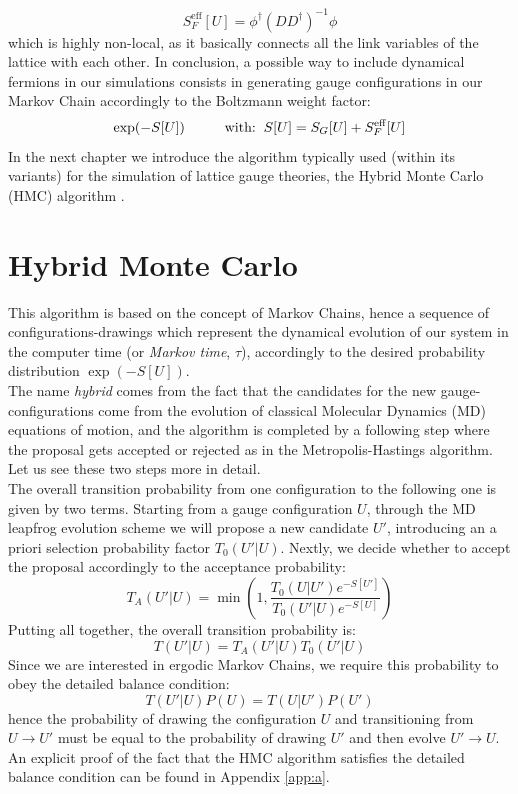\begin{equation}
    S_F^{\textrm{eff}} [U] = \phi^\dagger (DD^\dagger)^{-1} \phi
\end{equation}
which is highly non-local, as it basically connects all the link variables of the lattice with each other.
In conclusion, a possible way to include dynamical fermions in our simulations consists in generating gauge configurations in our Markov Chain accordingly to the Boltzmann weight factor:
\begin{equation}
    \exp(-S[U]) \hspace{10mm} \mbox{with:} \hspace{2mm} S[U] = S_G[U] + S_F^{\textrm{eff}} [U]
\end{equation}
In the next chapter we introduce the algorithm typically used (within its variants) for the simulation of lattice gauge theories, the Hybrid Monte Carlo (HMC) algorithm \cite{DUANE1987216}.  

\section{Hybrid Monte Carlo}
This algorithm is based on the concept of Markov Chains, hence a sequence of configurations-drawings which represent the dynamical evolution of our system in the computer time (or \textit{Markov time}, $\tau$), accordingly to the desired probability distribution $\exp(-S[U])$.
\\ The name \textit{hybrid} comes from the fact that the candidates for the new gauge-configurations come from the evolution of classical Molecular Dynamics (MD) equations of motion, and the algorithm is completed by a following step where the proposal gets accepted or rejected as in the Metropolis-Hastings algorithm. Let us see these two steps more in detail.
\\ The overall transition probability from one configuration to the following one is given by two terms. Starting from a gauge configuration $U$, through the MD leapfrog evolution scheme we will propose a new candidate $U'$, introducing an a priori selection probability factor $T_0(U' | U)$. Nextly, we decide whether to accept the proposal accordingly to the acceptance probability:
\begin{equation}
    T_A (U'|U) = \min \left(1, \frac{T_0(U|U') e^{-S[U']}}{T_0(U'|U) e^{-S[U]}}\right)
\end{equation} 
Putting all together, the overall transition probability is:
\begin{equation*}
    T(U'|U) = T_A(U'|U)T_0(U'|U)
\end{equation*}
Since we are interested in ergodic Markov Chains, we require this probability to obey the detailed balance condition:
\begin{equation}
    T(U'|U) P(U) = T(U|U')P(U')
\end{equation}
hence the probability of drawing the configuration $U$ and transitioning from $U \to U'$ must be equal to the probability of drawing $U'$ and then evolve $U' \to U.$ An explicit proof of the fact that the HMC algorithm satisfies the detailed balance condition can be found in Appendix \ref{app:a}.
